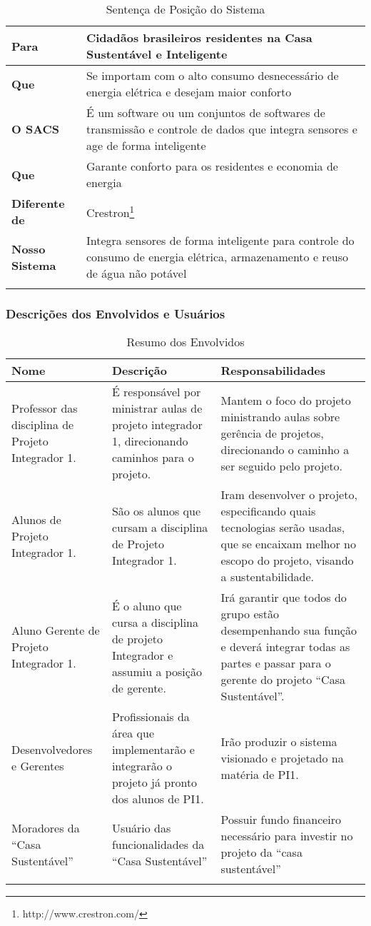 \begin{longtable}{|l|m{7cm}|}
	\hline \textbf{Para} & Cidadãos brasileiros residentes na Casa Sustentável e Inteligente \\
	\hline \textbf{Que} & Se importam com o alto consumo desnecessário de energia elétrica e desejam maior conforto\\
	\hline \textbf{O SACS} & É um software ou um conjuntos de softwares de transmissão e controle de dados que
	integra sensores e age de forma inteligente\\
	\hline \textbf{Que} & Garante conforto para os residentes e economia de energia\\
	\hline \textbf{Diferente de} & Crestron\footnote{http://www.crestron.com/}\\
	\hline \textbf{Nosso Sistema} & Integra sensores de forma inteligente para controle do consumo de energia elétrica,
	armazenamento e reuso de água não potável\\
	\hline
\caption{Sentença de Posição do Sistema}
\label{Sentenca_de_Posicao_do_Sistema}
\end{longtable}

\subsubsection{Descrições dos Envolvidos e Usuários}


\begin{longtable}{|m{5cm}|m{5cm}|m{5cm}|}
	\hline \textbf{Nome} & \textbf{Descrição} & \textbf{Responsabilidades}\\
	\hline Professor das disciplina de Projeto Integrador 1. & É responsável por ministrar aulas de projeto integrador
	1, direcionando caminhos para o projeto. & Mantem o foco do projeto ministrando aulas sobre gerência de projetos,
	direcionando o caminho a ser seguido pelo projeto. \\
	\hline Alunos de  Projeto Integrador 1. & São os alunos que cursam a disciplina de  Projeto Integrador 1. & Iram
	desenvolver o projeto, especificando quais tecnologias serão usadas, que se encaixam melhor no escopo do projeto,
	visando a sustentabilidade.\\
	\hline Aluno Gerente de Projeto Integrador 1. & É o aluno que cursa a disciplina de projeto Integrador e assumiu a
	posição de gerente. & Irá garantir que todos do grupo estão desempenhando sua função e deverá integrar todas as
	partes e passar para o gerente do projeto “Casa Sustentável”.\\
	\hline Desenvolvedores e Gerentes & Profissionais da área que implementarão e integrarão o projeto já pronto dos
	alunos de PI1. & Irão produzir o sistema visionado e projetado na matéria de PI1.\\
	\hline Moradores da “Casa Sustentável” & Usuário das funcionalidades da “Casa Sustentável” & Possuir fundo
	financeiro necessário para investir no projeto da “casa sustentável”\\
	\hline
\caption{Resumo dos Envolvidos}
\label{Resumo_dos_Envolvidos}
\end{longtable}

